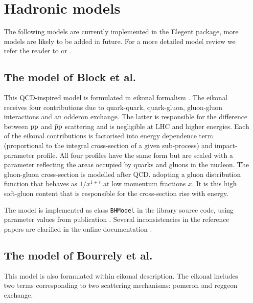 \documentclass[preprint,12pt]{elsarticle}
\def\class#1{{\tt #1}}
\begin{document}

\section{Hadronic models}\label{s:had mod}

The following models are currently implemented in the Elegent package, more models are likely to be added in future. For a more detailed model review we refer the reader to \cite[section 1.1]{jan_thesis} or \cite[section 4]{dremin13}.

\subsection{The model of Block et al.}

This QCD-inspired model is formulated in eikonal formalism \cite{bh99,block06}. The eikonal receives four contributions due to quark-quark, quark-gluon, gluon-gluon interactions and an odderon exchange. The latter is responsible for the difference between $\rm pp$ and $\rm \bar p p$ scattering and is negligible at LHC and higher energies. Each of the eikonal contributions is factorised into energy dependence term (proportional to the integral cross-section of a given sub-process) and impact-parameter profile. All four profiles have the same form but are scaled with a parameter reflecting the areas occupied by quarks and gluons in the nucleon. The gluon-gluon cross-section is modelled after QCD, adopting a gluon distribution function that behaves as $1/x^{1+\epsilon}$ at low momentum fractions $x$. It is this high soft-gluon content that is responsible for the cross-section rise with energy.

The model is implemented as class \class{BHModel} in the library source code, using parameter values from publication \cite{block06}. Several inconsistencies in the reference papers \cite{bh99,block06} are clarified in the online documentation \cite[Wiki section, page HMBlock]{elegent}.

\subsection{The model of Bourrely et al.}

This model \cite{bsw79,bsw84,bsw03,bsw11} is also formulated within eikonal description. The eikonal includes two terms corresponding to two scattering mechanisms: pomeron and reggeon exchange.
\end{document}

